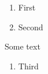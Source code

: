 \documentclass{article}
\begin{document}
\begin{enumerate}
\item First
\item Second
\end{enumerate}
Some text
\begin{enumerate}
\item Third
\end{enumerate}
\end{document}
